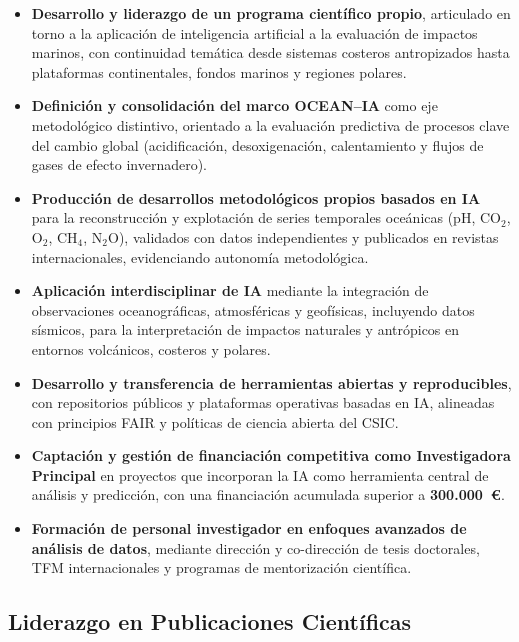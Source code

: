 \documentclass[11pt,a4paper]{article}
\begin{document}
\begin{itemize}[leftmargin=*]

    \item \textbf{Desarrollo y liderazgo de un programa científico propio}, articulado en torno a la aplicación de inteligencia artificial a la evaluación de impactos marinos, con continuidad temática desde sistemas costeros antropizados hasta plataformas continentales, fondos marinos y regiones polares.

    \item \textbf{Definición y consolidación del marco OCEAN--IA} como eje metodológico distintivo, orientado a la evaluación predictiva de procesos clave del cambio global (acidificación, desoxigenación, calentamiento y flujos de gases de efecto invernadero).

    \item \textbf{Producción de desarrollos metodológicos propios basados en IA} para la reconstrucción y explotación de series temporales oceánicas (pH, CO$_2$, O$_2$, CH$_4$, N$_2$O), validados con datos independientes y publicados en revistas internacionales, evidenciando autonomía metodológica.

    \item \textbf{Aplicación interdisciplinar de IA} mediante la integración de observaciones oceanográficas, atmosféricas y geofísicas, incluyendo datos sísmicos, para la interpretación de impactos naturales y antrópicos en entornos volcánicos, costeros y polares.

    \item \textbf{Desarrollo y transferencia de herramientas abiertas y reproducibles}, con repositorios públicos y plataformas operativas basadas en IA, alineadas con principios FAIR y políticas de ciencia abierta del CSIC.

    \item \textbf{Captación y gestión de financiación competitiva como Investigadora Principal} en proyectos que incorporan la IA como herramienta central de análisis y predicción, con una financiación acumulada superior a \textbf{300.000~€}.

    \item \textbf{Formación de personal investigador en enfoques avanzados de análisis de datos}, mediante dirección y co-dirección de tesis doctorales, TFM internacionales y programas de mentorización científica.

\end{itemize}
\newpage
\subsection{Liderazgo en Publicaciones Científicas}
\end{document}
